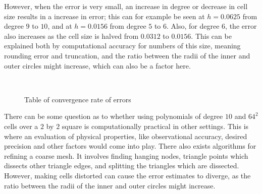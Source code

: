 However, when the error is very small, an increase in degree or decrease in cell size results in 
a increase in error; this can for example be seen at $h=0.0625$ from degree $9$ to $10$, and 
at $h=0.0156$ from degree $5$ to $6$. 
Also, for degree $6$, the error also increases as the cell size is halved from $0.0312$ to $0.0156$.
This can be explained both by computational accuracy for 
numbers of this size, meaning rounding error and truncation, and the ratio between the radii of the
inner and outer circles might increase, which can also be a factor here.
\begin{figure}[ht]
    \center~
    \caption{Table of convergence rate of errors}\label{tab:convergence}
\end{figure}
There can be some question as to whether using polynomials of degree $10$ and $64^2$ cells over a 
$2$ by $2$ square is computationally practical in other settings. 
This is where an evaluation of physical properties, like observational accuracy, desired precision and other 
factors would come into play.
There also exists algorithms for refining a coarse mesh. It involves finding hanging nodes, triangle 
points which dissects other triangle edges, and splitting the triangles which are dissected. 
However, making cells distorted can cause the error estimates to diverge, as the ratio between the radii of the
inner and outer circles might increase.